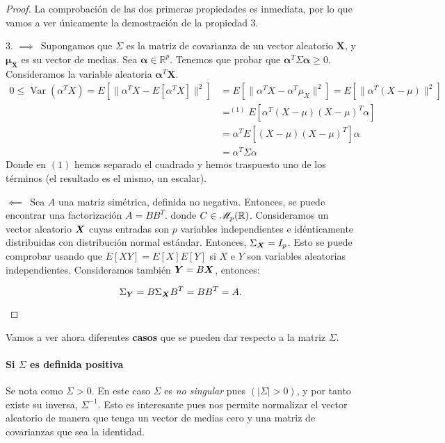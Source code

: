 \begin{proof}
  La comprobación de las dos primeras propiedades es inmediata, por lo que vamos a ver únicamente la demostración de la propiedad 3.
  \begin{nlist}
    \item[3.] $\boxed{\implies}\,$ Supongamos que $\Sigma$ es la matriz de covarianza de un vector aleatorio $\boldsymbol X$, y $\boldsymbol \mu_{\boldsymbol X}$ es su vector de medias. Sea $\boldsymbol \alpha \in \mathbb R^p$. Tenemos que probar que $\boldsymbol \alpha^T \Sigma \boldsymbol \alpha \geq 0$. Consideramos la variable aleatoria $\boldsymbol \alpha^T \boldsymbol X$. \begin{align*}
      0 \leq \operatorname{Var}(\alpha^T X) = E\left[\|\alpha^T X - E[\alpha^T X]\|^2\right] &= E\left[\|\alpha^T X - \alpha^T \mu_X\|^2\right] = E\left[\|\alpha^T(X-\mu)\|^2\right]\\ 
        &=^{(1)} E\left[\alpha^T(X-\mu)(X-\mu)^T \alpha\right] \\
        &= \alpha^T E\left[(X-\mu)(X-\mu)^T\right] \alpha \\
        &= \alpha^T \Sigma \alpha
    \end{align*} Donde en $(1)$ hemos separado el cuadrado y hemos traspuesto uno de los términos (el resultado es el mismo, un escalar).

    $\boxed{\impliedby}\,$ Sea $A$ una matriz simétrica, definida no negativa. Entonces, se puede encontrar una factorización $A = B B^T$. donde $C \in \mathscr{M}_{p}(\mathbb{R})$.
    Consideramos un vector aleatorio $\boldsymbol{X}$ cuyas entradas son $p$ variables independientes e idénticamente distribuidas con distribución normal estándar. Entonces, $\Sigma_{\boldsymbol{X}} = I_p$. Esto se puede comprobar usando que $E[XY] = E[X]E[Y]$ si $X$ e $Y$ son variables aleatorias independientes. Consideramos también $\boldsymbol{Y} = B\boldsymbol{X}$, entonces:

    \[
       \Sigma_{\boldsymbol{Y}} = B\Sigma_{\boldsymbol{X}} B^T = B B^T = A
    .\]

  \end{nlist}
\end{proof}

Vamos a ver ahora diferentes \textbf{casos} que se pueden dar respecto a la matriz $\Sigma$.

\paragraph{Si $\Sigma$ es definida positiva} Se nota como $\Sigma > 0$. En este caso $\Sigma$ es \emph{no singular} pues $(|\Sigma| > 0)$, y por tanto existe su inversa, $\Sigma^{-1}$. Esto es interesante pues nos permite normalizar el vector aleatorio de manera que tenga un vector de medias cero y una matriz de covarianzas que sea la identidad.

